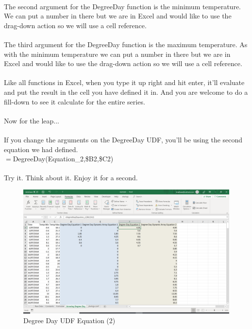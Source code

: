 \documentclass[12pt,a4paper,twoside,openright,titlepage]{article}
\begin{document}
\paragraph{} The second argument for the DegreeDay function is the minimum temperature. We can put a number in there but we are in Excel and would like to use the drag-down action so we will use a cell reference.

\paragraph{} The third argument for the DegreeDay function is the maximum temperature.  As with the minimum temperature we can put a number in there but we are in Excel and would like to use the drag-down action so we will use a cell reference.

\paragraph{} Like all functions in Excel, when you type it up right and hit enter, it'll evaluate and put the result in the cell you have defined it in. And you are welcome to do a fill-down to see it calculate for the entire series.

\paragraph{} Now for the leap...

\paragraph{} If you change the arguments on the DegreeDay UDF, you'll be using the second equation we had defined.\\

$=$DegreeDay(Equation\_2,\$B2,\$C2) 

\paragraph{} Try it. Think about it. Enjoy it for a second.

\begin{figure}[h!]
	\centering
	\includegraphics[scale=0.4]{images/degreeday_equation_2.PNG}
	\caption{Degree Day UDF Equation (2)}
\end{figure}
\end{document}
